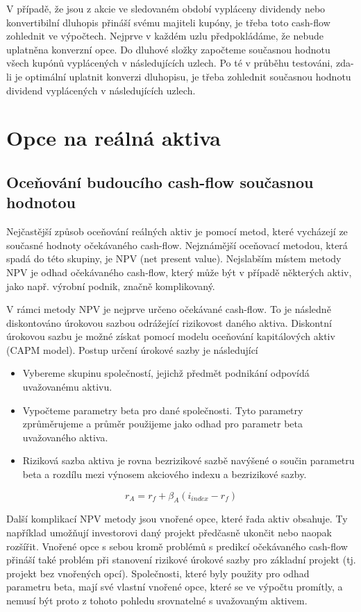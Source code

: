 \documentclass[a4paper]{book}
\begin{document}
V případě, že jsou z akcie ve sledovaném období vypláceny dividendy nebo konvertibilní dluhopis přináší svému majiteli kupóny, je třeba toto cash-flow zohlednit ve výpočtech. Nejprve v každém uzlu předpokládáme, že nebude uplatněna konverzní opce. Do dluhové složky započteme současnou hodnotu všech kupónů vyplácených v následujících uzlech. Po té v průběhu testováni, zda-li je optimální uplatnit konverzi dluhopisu, je třeba zohlednit současnou hodnotu dividend vyplácených v následujících uzlech.

\chapter{Opce na reálná aktiva}

\section{Oceňování budoucího cash-flow současnou hodnotou}

Nejčastější způsob oceňování reálných aktiv je pomocí metod, které vycházejí ze současné hodnoty očekávaného cash-flow. Nejznámější oceňovací metodou, která spadá do této skupiny, je NPV (net present value). Nejslabším místem metody NPV je odhad očekávaného cash-flow, který může být v případě některých aktiv, jako např. výrobní podnik, značně komplikovaný.

V rámci metody NPV je nejprve určeno očekávané cash-flow. To je následně diskontováno úrokovou sazbou odrážející rizikovost daného aktiva. Diskontní úrokovou sazbu je možné získat pomocí modelu oceňování kapitálových aktiv (CAPM model). Postup určení úrokové sazby je následující
\begin{itemize}
\item Vybereme skupinu společností, jejichž předmět podnikání odpovídá uvažovanému aktivu.
\item Vypočteme parametry beta pro dané společnosti. Tyto parametry zprůměrujeme a průměr použijeme jako odhad pro parametr beta uvažovaného aktiva.
\item Riziková sazba aktiva je rovna bezrizikové sazbě navýšené o součin parametru beta a rozdílu mezi výnosem akciového indexu a bezrizikové sazby.
\end{itemize}
\begin{equation*}
r_A = r_f + \beta_A(i_{index} - r_f)
\end{equation*}

Další komplikací NPV metody jsou vnořené opce, které řada aktiv obsahuje. Ty například umožňují investorovi daný projekt předčasně ukončit nebo naopak rozšířit. Vnořené opce s sebou kromě problémů s predikcí očekávaného cash-flow přináší také problém při stanovení rizikové úrokové sazby pro základní projekt (tj. projekt bez vnořených opcí). Společnosti, které byly použity pro odhad parametru beta, mají své vlastní vnořené opce, které se ve výpočtu promítly, a nemusí být proto z tohoto pohledu srovnatelné s uvažovaným aktivem.
\end{document}
